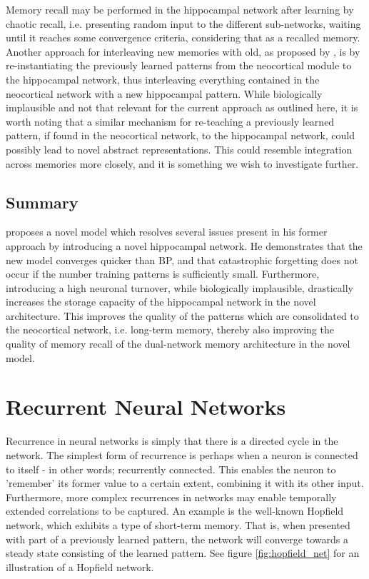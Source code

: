 Memory recall may be performed in the hippocampal network after learning by chaotic recall, i.e. presenting random input to the different sub-networks, waiting until it reaches some convergence criteria, considering that as a recalled memory. Another approach for interleaving new memories with old, as proposed by \cite{French1997}, is by re-instantiating the previously learned patterns from the neocortical module to the hippocampal network, thus interleaving everything contained in the neocortical network with a new hippocampal pattern. While biologically implausible and not that relevant for the current approach as outlined here, it is worth noting that a similar mechanism for re-teaching a previously learned pattern, if found in the neocortical network, to the hippocampal network, could possibly lead to novel abstract representations. This could resemble integration across memories more closely, and it is something we wish to investigate further.

\subsection{Summary}
\cite{Hattori2014} proposes a novel model which resolves several issues present in his former approach by introducing a novel hippocampal network. He demonstrates that the new model converges quicker than BP, and that catastrophic forgetting does not occur if the number training patterns is sufficiently small. Furthermore, introducing a high neuronal turnover, while biologically implausible, drastically increases the storage capacity of the hippocampal network in the novel architecture. This improves the quality of the patterns which are consolidated to the neocortical network, i.e. long-term memory, thereby also improving the quality of memory recall of the dual-network memory architecture in the novel model.


\section{Recurrent Neural Networks}

Recurrence in neural networks is simply that there is a directed cycle in the network. The simplest form of recurrence is perhaps when a neuron is connected to itself - in other words; recurrently connected. This enables the neuron to 'remember' its former value to a certain extent, combining it with its other input. Furthermore, more complex recurrences in networks may enable temporally extended correlations to be captured. An example is the well-known Hopfield network, which exhibits a type of short-term memory. That is, when presented with part of a previously learned pattern, the network will converge towards a steady state consisting of the learned pattern. See figure \ref{fig:hopfield_net} for an illustration of a Hopfield network.

